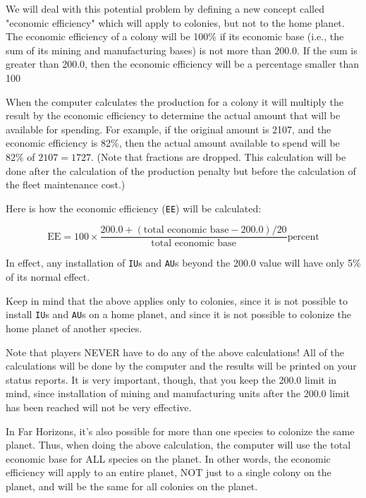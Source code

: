 \documentclass[10pt,titlepage]{article}
\begin{document}
We will deal with this potential problem by defining a new concept called
"economic efficiency" which will apply to colonies, but not to the home planet.
The economic efficiency of a colony will be 100\% if its economic base (i.e.,
the sum of its mining and manufacturing bases) is not more than 200.0.  If the
sum is greater than 200.0, then the economic efficiency will be a percentage
smaller than 100%

When the computer calculates the production for a colony it will multiply the
result by the economic efficiency to determine the actual amount that will be
available for spending.  For example, if the original amount is 2107, and the
economic efficiency is 82\%, then the actual amount available to spend will
be $82\%$ of $2107 = 1727$.  (Note that fractions are dropped.  This calculation
will be done after the calculation of the production penalty but before the
calculation of the fleet maintenance cost.)

Here is how the economic efficiency (\texttt{EE}) will be calculated:

\[
     \textrm{EE}  =  100  \times  \dfrac{200.0 + (\textrm{total economic base} - 200.0) / 20}{\textrm{total economic base}}\textrm{percent}
  \]                              

In effect, any installation of \texttt{IU}s and \texttt{AU}s beyond the 200.0 value will have
only 5\% of its normal effect.

\begin{informationnote}
Keep in mind that the above applies only to colonies, since it is not
possible to install \texttt{IU}s and \texttt{AU}s on a home planet, and since it is not
possible to colonize the home planet of another species.
\end{informationnote}

Note that players NEVER have to do any of the above calculations! All of the
calculations will be done by the computer and the results will be printed on
your status reports.  It is very important, though, that you keep the 200.0
limit in mind, since installation of mining and manufacturing units after the
200.0 limit has been reached will not be very effective.

In Far Horizons, it's also possible for more than one species to colonize the
same planet.  Thus, when doing the above calculation, the computer will use
the total economic base for ALL species on the planet.  In other words, the
economic efficiency will apply to an entire planet, NOT just to a single colony
on the planet, and will be the same for all colonies on the planet.
\end{document}
